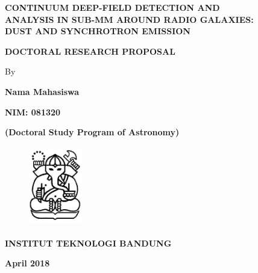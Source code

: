 \pagestyle{empty}
\begin{titlepage}
\begin{center}
\mbox{}
\vspace{1cm}

\textbf{CONTINUUM DEEP-FIELD DETECTION AND \\ ANALYSIS IN SUB-MM AROUND RADIO GALAXIES: \\ DUST AND SYNCHROTRON EMISSION}

\vspace{3cm}

\textbf{DOCTORAL RESEARCH PROPOSAL}\\

\vspace{3cm}

\normalsize{By}

\textbf{Nama Mahasiswa}

\textbf{NIM: 081320}

\textbf{(Doctoral Study Program of Astronomy)}

\vspace{2.0cm}

\begin{figure}[!h]
\centering
\includegraphics[width=2.35cm, height=3.5cm]{fig/logo_itb.png}
\end{figure}

\vspace{2.0cm}

\textbf{INSTITUT TEKNOLOGI BANDUNG}

\textbf{April 2018}

\end{center}
\end{titlepage}

\cleardoublepage
